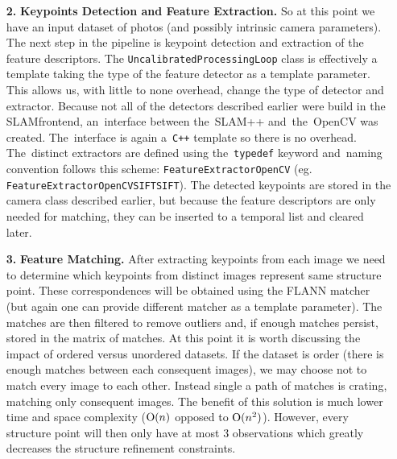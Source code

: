 \begin{itemize}
\item[\textbf{2.}] \textbf{Keypoints Detection and Feature Extraction.}
So at this point we have an input dataset of photos (and possibly intrinsic camera parameters). The next step in the pipeline is keypoint detection and extraction of the feature descriptors. The \texttt{UncalibratedProcessingLoop} class is effectively a template taking the type of the feature detector as a template parameter. This allows us, with little to none overhead, change the type of detector and extractor. Because not all of the detectors described earlier were build in the SLAM\textunderscore frontend, an~interface between the~SLAM++ and~the~OpenCV was created. The~interface is again a~\texttt{C++} template so there is no overhead. The~distinct extractors are defined using the~\texttt{typedef} keyword and~naming convention follows this scheme: \texttt{FeatureExtractor\textunderscore OpenCV\textunderscore[detector]\textunderscore[extractor]} (eg. \texttt{FeatureExtractor\textunderscore OpenCV\textunderscore SIFT\textunderscore SIFT}). The detected keypoints are stored in the camera class described earlier, but because the feature descriptors are only needed for matching, they can be inserted to a temporal list and cleared later.

\item[\textbf{3.}] \textbf{Feature Matching.}
After extracting keypoints from each image we need to determine which keypoints from distinct images represent same structure point. These correspondences will be obtained using the FLANN matcher (but again one can provide different matcher as a template parameter). The matches are then filtered to remove outliers and, if enough matches persist, stored in the matrix of matches. At this point it is worth discussing the impact of ordered versus unordered datasets. If the dataset is order (there is enough matches between each consequent images), we may choose not to match every image to each other. Instead single a path of matches is crating, matching only consequent images. The benefit of this solution is much lower time and space complexity ($\textrm O(n)$ opposed to $\textrm O(n^2)$). However, every structure point will then only have at most 3 observations which greatly decreases the structure refinement constraints. 


\end{itemize}
